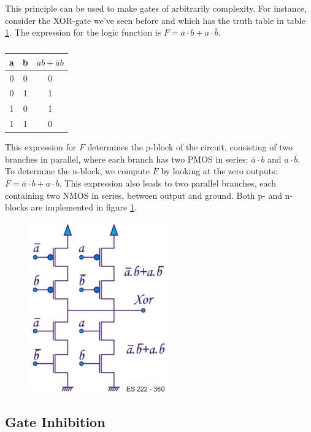 This principle can be used to make gates of arbitrarily complexity. For instance, consider the XOR-gate we've seen before and which has the truth table in table \ref{table:xor}. The expression for the logic function is $F = \overline{a} \cdot b + a \cdot \overline{b}$.\\
\begin{table}
	\centering
	\begin{tabular}{|c|c|c|}
		\hline
		a & b  & $a\overline{b} + \overline{a}b$ \\
		\hline\hline
		0 & 0 & 0 \\
		\hline
		0 & 1 & 1 \\
		\hline
		1 & 0 & 1 \\
		\hline
		1 & 1 & 0 \\
		\hline
	\end{tabular}
\caption{}
\label{table:xor}
\end{table}
This expression for $F$ determines the p-block of the circuit, consisting of two branches in parallel, where each branch has two PMOS in series: $\overline{a} \cdot b$ and $a \cdot \overline{b}$.\\
To determine the n-block, we compute $\overline{F}$ by looking at the zero outputs: $\overline{F} = \overline{a} \cdot \overline{b} + a \cdot b$. This expression also leads to two parallel branches, each containing two NMOS in series, between output and ground. Both p- and n-blocks are implemented in figure \ref{fig:xor_gate}.

\begin{figure}[h!]
	\centering
	\includegraphics[width=6cm]{figures/ch13/xor_gate.jpg}
	\caption{}
	\label{fig:xor_gate}
\end{figure}

\subsection{Gate Inhibition}
\label{sec:inhibition}

